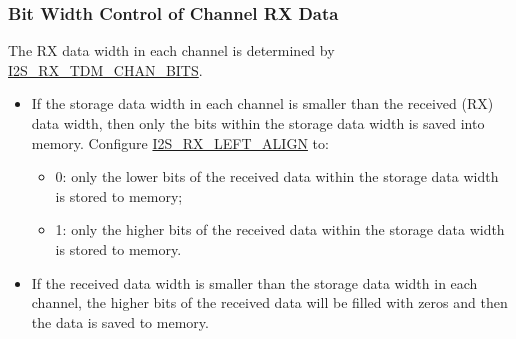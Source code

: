 \documentclass[main\_\_EN.tex]{subfiles}
\begin{document}
\subsubsection{Bit Width Control of Channel RX Data} 
The RX data width in each channel is determined by \hyperref[fielddesc:I2SRXTDMCHANBITS]{I2S\_RX\_TDM\_CHAN\_BITS}.
\begin{itemize}
\item If the storage data width in each channel is smaller than the received (RX) data width, then only the bits within the storage data width is saved into memory. Configure \hyperref[fielddesc:I2SRXLEFTALIGN]{I2S\_RX\_LEFT\_ALIGN} to:
\begin{itemize}
\item 0: only the lower bits of the received data within the storage data width is stored to memory;
\item 1: only the higher bits of the received data within the storage data width is stored to memory.
\end{itemize}
\item If the received data width is smaller than the storage data width in each channel, the higher bits of the received data will be filled with zeros and then the data is saved to memory.
\end{itemize}
\end{document}
